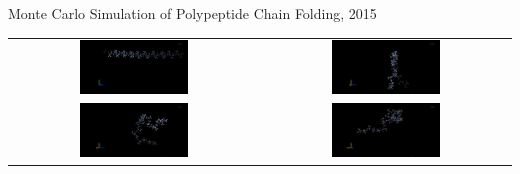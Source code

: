 \documentclass{beamer}
\begin{document}
    \begin{frame}{Monte Carlo Simulation of Polypeptide Chain Folding, 2015}
        \begin{table}[h]
            \centering
            \begin{tabular}{cc}
                \includegraphics[width=0.45\textwidth]{figures/ap1.png} &  \includegraphics[width=0.45\textwidth]{figures/ap3.png} \\
                \includegraphics[width=0.45\textwidth]{figures/ap4.png} &  \includegraphics[width=0.45\textwidth]{figures/ap6.png} \\
            \end{tabular}
        \end{table}
    \end{frame}
\end{document}
